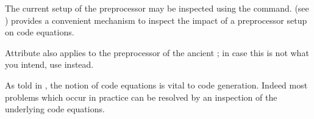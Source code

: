 \begin{isabellebody}
\begin{isamarkuptext}
  \noindent The current setup of the preprocessor may be inspected
  using the \hypertarget{command.print-codeproc}{\hyperlink{command.print-codeproc}{\mbox{}}} command.  \hypertarget{command.code-thms}{\hyperlink{command.code-thms}{\mbox{}}} (see ) provides a convenient
  mechanism to inspect the impact of a preprocessor setup on code
  equations.

  \begin{warn}
    Attribute \hyperlink{attribute.code-unfold}{\mbox{}} also applies to the
    preprocessor of the ancient ; in case
    this is not what you intend, use \hyperlink{attribute.code-inline}{\mbox{}} instead.
  \end{warn}%
\end{isamarkuptext}%
\isamarkuptrue%
%
\isamarkuptrue%
%
\begin{isamarkuptext}%
As told in , the notion of code equations is
  vital to code generation.  Indeed most problems which occur in
  practice can be resolved by an inspection of the underlying code
  equations.


\end{isamarkuptext}
\end{isabellebody}
